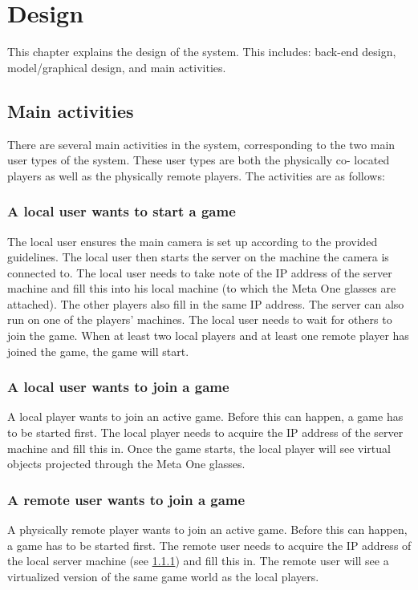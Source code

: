 \chapter{Design} \label{cha:design}
	This chapter explains the design of the system. This includes: back-end
	design, model/graphical design, and main activities.

	\section{Main activities} \label{sec:mainactivities}
		There are several main activities in the system, corresponding to the two
		main user types of the system. These user types are both the physically co-
		located	players as well as the physically remote players. The activities
		are as follows:

		\subsection{A local user wants to start a game} \label{ssec:userstartgame}
			The local user ensures the main camera is set up according to the 
			provided guidelines. The local user then starts the server on the 
			machine the camera is connected to. The local user needs to take note 
			of the IP address of the server machine and fill this into his local 
			machine (to which the Meta One glasses are attached). The other players
			also fill in the same IP address. The server can also run on one of the 
			players' machines. The local user needs to wait for others to join the 
			game. When at least two local players and at least one remote player 
			has joined the game, the game will start.
			
		\subsection{A local user wants to join a game} \label{ssec:localjoingame}
			A local player wants to join an active game. Before this can
			happen, a game has to be started first. The local player needs to 
			acquire the IP address of the server machine and fill this in.
			Once the game starts, the local player will see virtual objects projected 
			through the Meta One glasses.

		\subsection{A remote user wants to join a game} \label{ssec:remotejoingame}
			A physically remote player wants to join an active game. Before this can
			happen, a game has to be started first. The remote user needs to acquire 
			the IP address of the local server machine (see \ref{ssec:userstartgame})
			and fill this in. The remote user will see a virtualized version of the 
			same game world as the local players.
			
